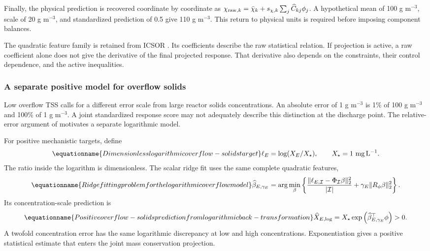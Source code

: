 Finally, the physical prediction is recovered coordinate by coordinate as $\chi_{{\rm raw},k}=\bar\chi_k+s_{\chi,k}\sum_j\widehat C_{kj}\phi_j$. A hypothetical mean of 100 g m$^{-3}$, scale of 20 g m$^{-3}$, and standardized prediction of 0.5 give 110 g m$^{-3}$. This return to physical units is required before imposing component balances.

The quadratic feature family is retained from ICSOR \citep{Selerio2026}. Its coefficients describe the raw statistical relation. If projection is active, a raw coefficient alone does not give the derivative of the final projected response. That derivative also depends on the constraints, their control dependence, and the active inequalities.

\subsubsection{A separate positive model for overflow solids}

Low overflow TSS calls for a different error scale from large reactor solids concentrations. An absolute error of 1 g m$^{-3}$ is 1\% of 100 g m$^{-3}$ and 100\% of 1 g m$^{-3}$. A joint standardized response score may not adequately describe this distinction at the discharge point. The relative-error argument of \citet{Tofallis2015} motivates a separate logarithmic model.

For positive mechanistic targets, define
\begin{equation}
\equationname{Dimensionless logarithmic overflow-solids target}
\ell_E=\log(X_E/X_\star),\qquad X_\star=1\ \mathrm{mg\,L^{-1}}.
\label{eq:plant_log_target}
\end{equation}
The ratio inside the logarithm is dimensionless. The scalar ridge fit uses the same complete quadratic features,
\begin{equation}
\equationname{Ridge fitting problem for the logarithmic overflow model}
\widehat\beta_{E,\gamma_E}=\arg\min_\beta
\left\{\frac{\|\ell_{E,\mathcal I}-\Phi_{\mathcal I}\beta\|_2^2}{|\mathcal I|}
+\gamma_E\|R_\phi\beta\|_2^2\right\}.
\end{equation}
Its concentration-scale prediction is
\begin{equation}
\equationname{Positive overflow-solids prediction from logarithmic back-transformation}
\widehat X_{E,\log}=X_\star\exp\left(\widehat\beta_{E,\gamma_E}^\top\phi\right)>0.
\label{eq:plant_log_prediction}
\end{equation}
A twofold concentration error has the same logarithmic discrepancy at low and high concentrations. Exponentiation gives a positive statistical estimate that enters the joint mass conservation projection.

